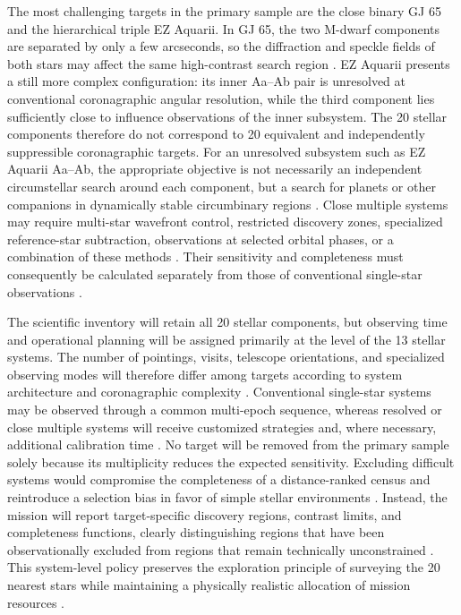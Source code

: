 The most challenging targets in the primary sample are the close binary GJ 65 and the hierarchical triple EZ Aquarii. In GJ 65, the two M-dwarf components are separated by only a few arcseconds, so the diffraction and speckle fields of both stars may affect the same high-contrast search region \cite{Thomas2015}. 
EZ Aquarii presents a still more complex configuration: its inner Aa--Ab pair is unresolved at conventional coronagraphic angular resolution, while the third component lies sufficiently close to influence observations of the inner subsystem. The 20 stellar components therefore do not correspond to 20 equivalent and independently suppressible coronagraphic targets. For an unresolved subsystem such as EZ Aquarii Aa--Ab, the appropriate objective is not necessarily an independent circumstellar search around each component, but a search for planets or other companions in dynamically stable circumbinary regions \cite{Holman1999}. 
Close multiple systems may require multi-star wavefront control, restricted discovery zones, specialized reference-star subtraction, observations at selected orbital phases, or a combination of these methods \cite{Sirbu2017}. 
Their sensitivity and completeness must consequently be calculated separately from those of conventional single-star observations \cite{Currie2022}.

The scientific inventory will retain all 20 stellar components, but observing time and operational planning will be assigned primarily at the level of the 13 stellar systems. The number of pointings, visits, telescope orientations, and specialized observing modes will therefore differ among targets according to system architecture and coronagraphic complexity \cite{LUVOIR2019}.
Conventional single-star systems may be observed through a common multi-epoch sequence, whereas resolved or close multiple systems will receive customized strategies and, where necessary, additional calibration time \cite{LUVOIR2019}. 
No target will be removed from the primary sample solely because its multiplicity reduces the expected sensitivity. Excluding difficult systems would compromise the completeness of a distance-ranked census and reintroduce a selection bias in favor of simple stellar environments \cite{Henry2018}. 
Instead, the mission will report target-specific discovery regions, contrast limits, and completeness functions, clearly distinguishing regions that have been observationally excluded from regions that remain technically unconstrained \cite{Bowler2016}. 
This system-level policy preserves the exploration principle of surveying the 20 nearest stars while maintaining a physically realistic allocation of mission resources
\cite{LUVOIR2019}.

